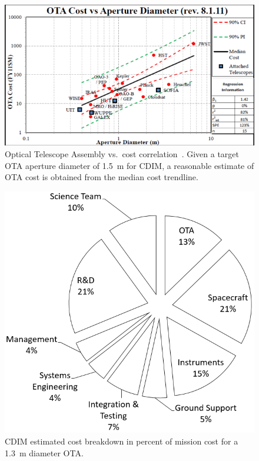 \documentclass{ws-jai}
\begin{document}
\begin{figure}[htp]
    \centering
    \includegraphics[width=.8\linewidth]{figs/ota_cost-diameter_stahl2010.png}
    \caption{Optical Telescope Assembly vs.\ cost correlation~\cite{stahl2013}. Given a target OTA aperture diameter of \SI{1.5}{\meter} for CDIM, a reasonable estimate of OTA cost is obtained from the median cost trendline.
\label{fig:cost-stahl-ota-cost-vs-diameter}
}
\end{figure}

\begin{figure}[htp]
  \centering
    \centering
    \includegraphics[width=.6\linewidth]{figs/cost-breakdown-pie.png}
    \caption{CDIM estimated cost breakdown in percent of mission cost for a \SI{1.3}{\meter} diameter OTA.\@
\label{fig:cost-breakdown}
}
\end{figure}

\end{document}

